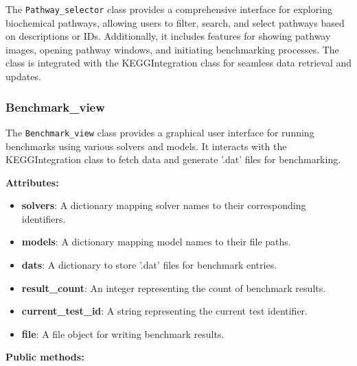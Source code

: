 The \texttt{Pathway\_selector} class provides a comprehensive interface for exploring biochemical pathways, allowing users to filter, search, and select pathways based on descriptions or IDs. Additionally, it includes features for showing pathway images, opening pathway windows, and initiating benchmarking processes. The class is integrated with the KEGGIntegration class for seamless data retrieval and updates.

\subsubsection{Benchmark\_view}

The \texttt{Benchmark\_view} class provides a graphical user interface for running benchmarks using various solvers and models. It interacts with the KEGGIntegration class to fetch data and generate '.dat' files for benchmarking.

\textbf{Attributes:}

\begin{itemize}
    \item \textbf{solvers}: A dictionary mapping solver names to their corresponding identifiers.
    \item \textbf{models}: A dictionary mapping model names to their file paths.
    \item \textbf{dats}: A dictionary to store '.dat' files for benchmark entries.
    \item \textbf{result\_count}: An integer representing the count of benchmark results.
    \item \textbf{current\_test\_id}: A string representing the current test identifier.
    \item \textbf{file}: A file object for writing benchmark results.
\end{itemize}

\textbf{Public methods:}

